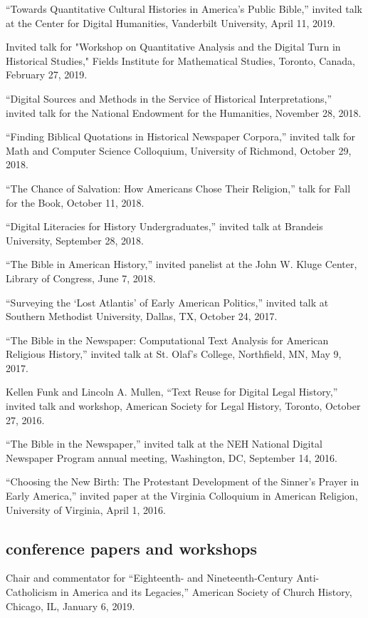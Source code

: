 \documentclass[11pt]{article}
\begin{document}
``Towards Quantitative Cultural Histories in America's Public Bible,'' invited talk at the Center for Digital Humanities, Vanderbilt University, April 11, 2019.

Invited talk for "Workshop on Quantitative Analysis and the Digital Turn in Historical Studies," Fields Institute for Mathematical Studies, Toronto, Canada, February 27, 2019.

``Digital Sources and Methods in the Service of Historical Interpretations,'' 
invited talk for the National Endowment for the Humanities, November 28, 
2018.

``Finding Biblical Quotations in Historical Newspaper Corpora,'' invited talk for Math and Computer Science Colloquium, University of Richmond, October 29, 2018.

``The Chance of Salvation: How Americans Chose Their Religion,'' talk for Fall for the Book, October 11, 2018.

``Digital Literacies for History Undergraduates,'' invited talk at Brandeis University, September 28, 2018.

``The Bible in American History,'' invited panelist at the John W. Kluge Center, Library of Congress, June 7, 2018.

``Surveying the `Lost Atlantis' of Early American Politics,'' invited talk at 
Southern Methodist University, Dallas, TX, October 24, 2017.

``The Bible in the Newspaper: Computational Text Analysis for American 
Religious History,'' invited talk at St. Olaf's College, Northfield, MN, May 
9, 2017.

Kellen Funk and Lincoln A. Mullen, ``Text Reuse for Digital Legal History,'' 
invited talk and workshop, American Society for Legal History, Toronto, October 27, 2016.

``The Bible in the Newspaper,'' invited talk at the NEH National Digital Newspaper Program annual meeting, Washington, DC, September 14, 2016.

``Choosing the New Birth: The Protestant Development of the Sinner's Prayer in 
Early America,'' invited paper at the Virginia Colloquium in American 
Religion, University of Virginia, April 1, 2016.

\subsection{conference papers and workshops}\label{conference-papers}

Chair and commentator for ``Eighteenth- and Nineteenth-Century Anti-Catholicism in America and its Legacies,'' American Society of Church History, Chicago, IL, January 6, 2019.
\end{document}
